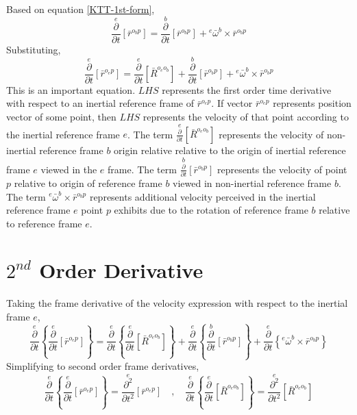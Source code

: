 Based on equation \ref{KTT-1st-form},
$$\overset{e}{\frac{\partial}{\partial t}}[\bar{r}^{o_{b}p}] = \overset{b}{\frac{\partial}{\partial t}}[\bar{r}^{o_{b}p}] + {}^{e}\bar{\omega}^{b}\times\bar{r}^{o_{b}p}$$
Substituting,
$$\overset{e}{\frac{\partial}{\partial t}}[\bar{r}^{o_{e}p}] = \overset{e}{\frac{\partial}{\partial t}}[\bar{R}^{o_{e}o_{b}}] + \overset{b}{\frac{\partial}{\partial t}}[\bar{r}^{o_{b}p}] + {}^{e}\bar{\omega}^{b}\times\bar{r}^{o_{b}p}$$
This is an important equation. 
$LHS$ represents the first order time derivative with respect to an inertial reference frame of $\displaystyle \bar{r}^{o_{e}p}$. 
If vector $\displaystyle \bar{r}^{o_{e}p}$ represents position vector of some point, then $LHS$ represents the velocity of that point according to the inertial reference frame $e$. 
The term $\displaystyle \overset{e}{\frac{\partial}{\partial t}}[\bar{R}^{o_{e}o_{b}}]$ represents the velocity of non-inertial reference frame $b$ origin relative relative to the origin of inertial reference frame $e$ viewed in the $e$ frame. 
The term $\displaystyle \overset{b}{\frac{\partial}{\partial t}}[\bar{r}^{o_{b}p}]$ represents the velocity of point $p$ relative to origin of reference frame $b$ viewed in non-inertial reference frame $b$. 
The term $\displaystyle {}^{e}\bar{\omega}^{b}\times\bar{r}^{o_{b}p}$ represents additional velocity perceived in the inertial reference frame $e$ point $p$ exhibits due to the rotation of reference frame $b$ relative to reference frame $e$.


\section{$2^{nd}$ Order Derivative} \label{Centrifugal, Coriolis, Azimuthal Introduction}
\begin{comment}
\end{comment}
Taking the frame derivative of the velocity expression with respect to the inertial frame $e$,
\begin{equation}
\overset{e}{\frac{\partial}{\partial t}}\left\{\overset{e}{\frac{\partial}{\partial t}}[\bar{r}^{o_{e}p}]\right\}      =    \overset{e}{\frac{\partial}{\partial t}}\left\{\overset{e}{\frac{\partial}{\partial t}}[\bar{R}^{o_{e}o_{b}}]\right\}     +  \overset{e}{\frac{\partial}{\partial t}}\left\{\overset{b}{\frac{\partial}{\partial t}}[\bar{r}^{o_{b}p}]\right\}      +   \overset{e}{\frac{\partial}{\partial t}}\left\{{}^{e}\bar{\omega}^{b}\times\bar{r}^{o_{b}p}\right\}
\label{intermediate-2}
\end{equation}
Simplifying to second order frame derivatives,
$$\overset{e}{\frac{\partial}{\partial t}}\left\{\overset{e}{\frac{\partial}{\partial t}}[\bar{r}^{o_{e}p}]\right\} = \overset{e}{\frac{\partial^{2}}{\partial t^{2}}}[\bar{r}^{o_{e}p}]\quad,\quad \overset{e}{\frac{\partial}{\partial t}}\left\{\overset{e}{\frac{\partial}{\partial t}}[\bar{R}^{o_{e}o_{b}}]\right\} =  \overset{e}{\frac{\partial^{2}}{\partial t^{2}}}[\bar{R}^{o_{e}o_{b}}]$$

